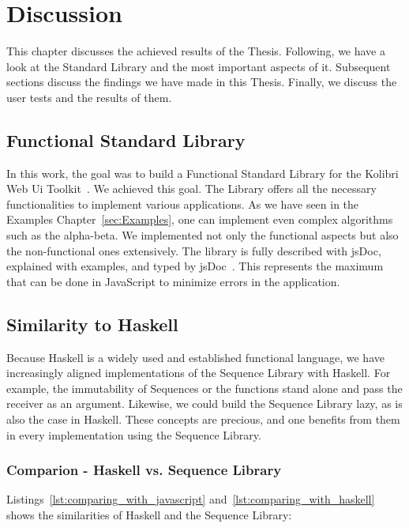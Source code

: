 \section{Discussion}
\label{sec:Discussion}
This chapter discusses the achieved results of the Thesis. Following, we have a look at the
Standard Library and the most important aspects of it. Subsequent sections
discuss the findings we have made in this Thesis. Finally, we discuss the user
tests and the results of them.

\subsection{Functional Standard Library}
\label{sub:Functional Standard Library}
In this work, the goal was to build a Functional Standard Library for the
Kolibri Web Ui Toolkit~\cite{kolibri}. We achieved
this goal. The Library offers all the necessary functionalities to implement
various applications. As we have seen in the Examples Chapter~\ref{sec:Examples}, one can implement
even complex algorithms such as the alpha-beta. We implemented not only the functional aspects but
also the non-functional ones extensively. The library is fully described with
jsDoc, explained with examples, and typed by jsDoc~\cite{jsdoc_use_2023}. This represents the maximum that can
be done in JavaScript to minimize errors in the application.

\subsection{Similarity to Haskell}
\label{sub:Similarity to Haskell}
Because Haskell is a widely used and established functional language, we have
increasingly aligned implementations of the Sequence Library with Haskell. For
example, the immutability of Sequences or the functions stand alone and pass
the receiver as an argument. Likewise, we could build the Sequence Library
lazy, as is also the case in Haskell. These concepts are precious, and one
benefits from them in every implementation using the Sequence Library.

\subsubsection{Comparion - Haskell vs. Sequence Library}
\label{Comparion - Haskell vs. Sequence Library}
Listings~\ref{lst:comparing_with_javascript} and~\ref{lst:comparing_with_haskell} 
shows the similarities of Haskell and the Sequence Library:

